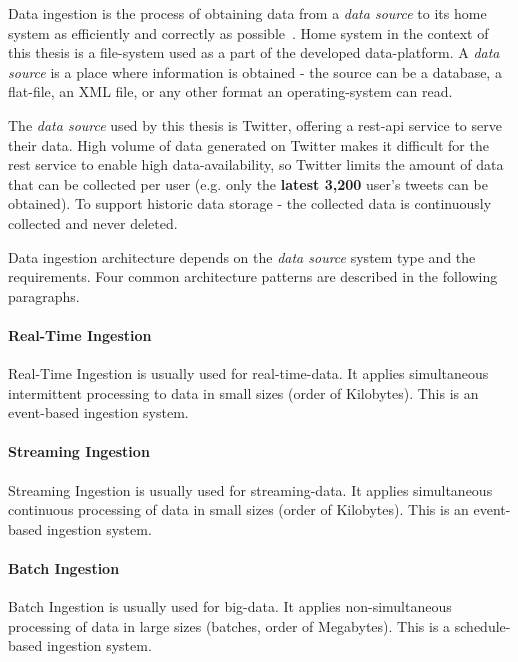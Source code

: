 Data ingestion is the process of obtaining data from a \textit{data source} to its home system as efficiently and correctly as possible~\cite{meehan2017data}. Home system in the context of this thesis is a \gls{file-system} used as a part of the developed \gls{data-platform}. A \textit{data source} is a place where information is obtained - the source can be a database, a \gls{flat-file}, an XML file, or any other format an \gls{operating-system} can read.

The \textit{data source} used by this thesis is Twitter, offering a \gls{rest-api} service to serve their data. High volume of data generated on Twitter makes it difficult for the \acrshort{rest} service to enable high \gls{data-availability}, so Twitter limits the amount of data that can be collected per user (e.g. only the \textbf{latest 3,200} user's tweets can be obtained). To support historic data storage - the collected data is continuously collected and never deleted.

Data ingestion architecture depends on the \textit{data source} system type and the  requirements. Four common architecture patterns are described in the following paragraphs.

\hfill

\paragraph{Real-Time Ingestion} Real-Time Ingestion is usually used for \gls{real-time-data}. It applies simultaneous intermittent processing to data in small sizes (order of Kilobytes). This is an \gls{event-based} ingestion system.

\paragraph{Streaming Ingestion} Streaming Ingestion is usually used for \gls{streaming-data}. It applies simultaneous continuous processing of data in small sizes (order of Kilobytes). This is an \gls{event-based} ingestion system.
 
\paragraph{Batch Ingestion} Batch Ingestion is usually used for \gls{big-data}. It applies non-simultaneous processing of data in large sizes (batches, order of Megabytes). This is a \gls{schedule-based} ingestion system.

